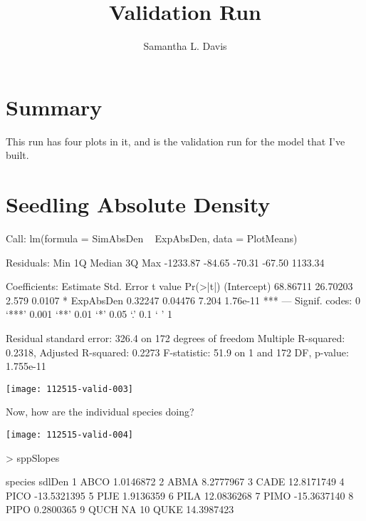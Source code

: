 \documentclass{article}
\begin{document}


\title{Validation Run}
\author{Samantha L. Davis}

\maketitle

\section{Summary}
This run has four plots in it, and is the validation run for the model that I've built.





\newpage

\section{Seedling Absolute Density}
\begin{Schunk}
\begin{Soutput}
Call:
lm(formula = SimAbsDen ~ ExpAbsDen, data = PlotMeans)

Residuals:
     Min       1Q   Median       3Q      Max 
-1233.87   -84.65   -70.31   -67.50  1133.34 

Coefficients:
            Estimate Std. Error t value Pr(>|t|)    
(Intercept) 68.86711   26.70203   2.579   0.0107 *  
ExpAbsDen    0.32247    0.04476   7.204 1.76e-11 ***
---
Signif. codes:  0 ‘***’ 0.001 ‘**’ 0.01 ‘*’ 0.05 ‘.’ 0.1 ‘ ’ 1

Residual standard error: 326.4 on 172 degrees of freedom
Multiple R-squared:  0.2318,	Adjusted R-squared:  0.2273 
F-statistic:  51.9 on 1 and 172 DF,  p-value: 1.755e-11
\end{Soutput}
\end{Schunk}
\texttt{[image: 112515-valid-003]}

Now, how are the individual species doing?

\texttt{[image: 112515-valid-004]}
\begin{Schunk}
\begin{Sinput}
>   sppSlopes
\end{Sinput}
\begin{Soutput}
   species      sdlDen
1     ABCO   1.0146872
2     ABMA   8.2777967
3     CADE  12.8171749
4     PICO -13.5321395
5     PIJE   1.9136359
6     PILA  12.0836268
7     PIMO -15.3637140
8     PIPO   0.2800365
9     QUCH          NA
10    QUKE  14.3987423
\end{Soutput}
\end{Schunk}
\end{document}
